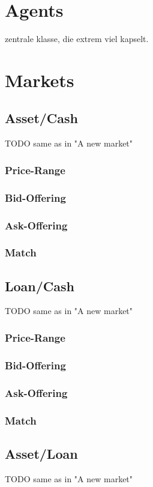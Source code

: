 \documentclass[Bachelorarbeit.tex]{subfiles}
\begin{document}
\section{Agents}
zentrale klasse, die extrem viel kapselt.

\section{Markets}
\subsection{Asset/Cash}
TODO same as in "A new market"
\subsubsection{Price-Range}
\subsubsection{Bid-Offering}
\subsubsection{Ask-Offering}
\subsubsection{Match}

\subsection{Loan/Cash}
TODO same as in "A new market"
\subsubsection{Price-Range}
\subsubsection{Bid-Offering}
\subsubsection{Ask-Offering}
\subsubsection{Match}

\subsection{Asset/Loan}
TODO same as in "A new market"
\end{document}
